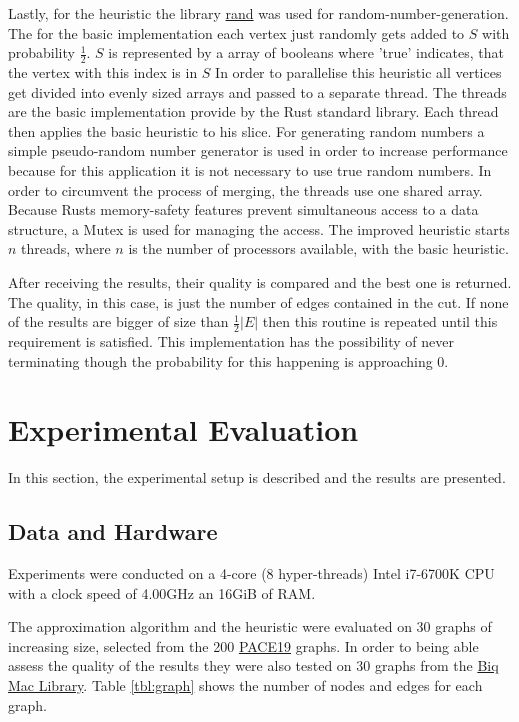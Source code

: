 \documentclass[twocolumn]{article}
\begin{document}
Lastly, for the heuristic the library \href{https://crates.io/crates/rand}{rand} was used for random-number-generation.
The for the basic implementation each vertex just randomly gets added to $S$ with probability $\frac{1}{2}$.
$S$ is represented by a array of booleans where 'true' indicates, that the vertex with this index is in $S$
In order to parallelise this heuristic all vertices get divided into evenly sized arrays and passed to a separate thread.
The threads are the basic implementation provide by the Rust standard library.
Each thread then applies the basic heuristic to his slice. For generating random numbers a simple pseudo-random number generator is used
in order to increase performance because for this application it is not necessary to use true random numbers.
In order to circumvent the process of merging, the threads use one shared array. 
Because Rusts memory-safety features prevent simultaneous access to a data structure, 
a Mutex is used for managing the access.
The improved heuristic starts $n$ threads, where $n$ is the number of processors available,
with the basic heuristic.

After receiving the results, their quality is compared and the best one is returned. The quality,
in this case, is just the number of edges contained in the cut.
If none of the results are bigger of size than $\frac{1}{2}|E|$ then this routine is repeated until
this requirement is satisfied. This implementation has the possibility of never terminating though
the probability for this happening is approaching 0.

\section{Experimental Evaluation}
In this section, the experimental setup is described and the results are presented.
\subsection{Data and Hardware}%
\label{sub:Data and Hardware}

Experiments were conducted on a 4-core (8 hyper-threads) Intel i7-6700K CPU with a clock speed
of 4.00GHz an 16GiB of RAM.

The approximation algorithm and the heuristic were evaluated on 30 graphs of increasing size,
selected from the 200 \href{https://pacechallenge.org/2019/vc/vc_exact/}{PACE19} graphs.
In order to being able assess the quality of the results they were also tested on 30 graphs
from the \href{https://biqmac.aau.at/biqmaclib.html}{Biq Mac Library}.
Table \ref{tbl:graph} shows the number of nodes and edges for each graph.
\end{document}
